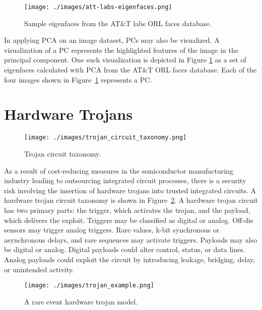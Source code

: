 \begin{figure}[H]
    \centering
    \texttt{[image: ./images/att-labs-eigenfaces.png]}
    \caption{Sample eigenfaces from the AT\&T labs ORL faces database\cite{lee2019portraits}.}
    \label{fig:eigenfaces}
\end{figure}

In applying PCA on an image dataset, PCs may also be visualized. A visualization
of a PC represents the highlighted features of the image in the principal
component. One such visualization is depicted in Figure \ref{fig:eigenfaces} as
a set of eigenfaces calculated with PCA from the AT\&T ORL faces database. Each
of the four images shown in Figure~\ref{fig:eigenfaces} represents a
PC\cite{139758, lee2019portraits}.


\section {Hardware Trojans}

\begin{figure}[H]
    \centering
    \texttt{[image: ./images/trojan\_circuit\_taxonomy.png]}
    \caption{Trojan circuit taxonomy\cite{4484928}.}
    \label{fig:hw_trojan_circuit_taxonomy}
\end{figure}

As a result of cost-reducing measures in the semiconductor manufacturing
industry leading to outsourcing integrated circuit processes, there is a
security risk involving the insertion of hardware trojans into trusted
integrated circuits. A hardware trojan circuit taxonomy is shown in
Figure~\ref{fig:hw_trojan_circuit_taxonomy}. A hardware trojan circuit has two
primary parts: the trigger, which activates the trojan, and the payload, which
delivers the exploit. Triggers may be classified as digital or analog. Off-die
sensors may trigger analog triggers. Rare values, k-bit synchronous or
asynchronous delays, and rare sequences may activate triggers. Payloads may also
be digital or analog. Digital payloads could alter control, status, or data
lines. Analog payloads could exploit the circuit by introducing leakage,
bridging, delay, or unintended activity\cite{4484928}.

\begin{figure}[h]
    \centering
    \texttt{[image: ./images/trojan\_example.png]}
    \caption{A rare event hardware trojan model\cite{4484928}.}
    \label{fig:hw_trojan_eample}
\end{figure}

